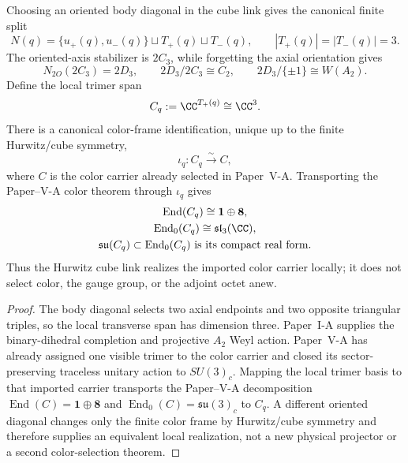 \documentclass[12pt,a4paper]{article}
\begin{document}
\begin{theorem}
\label{p10:thm:hurwitz-trimer-color-carrier}
Choosing an oriented body diagonal in the cube link gives the canonical finite split
\begin{equation}
\label{p10:eq:hurwitz-link-trimer-split}
N(q)=\{u_+(q),u_-(q)\}\sqcup T_+(q)\sqcup T_-(q),
\qquad |T_+(q)|=|T_-(q)|=3.
\end{equation}
The oriented-axis stabilizer is \(2C_3\), while forgetting the axial orientation gives
\begin{equation}
\label{p10:eq:local-binary-dihedral-color-skeleton}
N_{2O}(2C_3)=2D_3,
\qquad
2D_3/2C_3\cong C_2,
\qquad
2D_3/\{\pm1\}\cong W(A_2).
\end{equation}
Define the local trimer span
\begin{equation}
\label{p10:eq:local-trimer-color-carrier}
C_q:=\CC^{T_+(q)}\cong\CC^3.
\end{equation}
There is a canonical color-frame identification, unique up to the finite
Hurwitz/cube symmetry,
\[
\iota_q:C_q\xrightarrow{\sim}C,
\]
where \(C\) is the color carrier already selected in Paper~V-A.  Transporting the
Paper--V-A color theorem through \(\iota_q\) gives
\begin{equation}
\label{p10:eq:local-trimer-adjoint}
\begin{gathered}
\operatorname{End}(C_q)\cong\mathbf1\oplus\mathbf8,\\
\operatorname{End}_0(C_q)\cong\mathfrak{sl}_3(\CC),\\
\mathfrak{su}(C_q)\subset\operatorname{End}_0(C_q)
\ \text{is its compact real form}.
\end{gathered}
\end{equation}
Thus the Hurwitz cube link realizes the imported color carrier locally; it does
not select color, the gauge group, or the adjoint octet anew.
\end{theorem}
\begin{proof}
The body diagonal selects two axial endpoints and two opposite triangular
triples, so the local transverse span has dimension three.  Paper~I-A supplies the
binary-dihedral completion and projective \(A_2\) Weyl action.  Paper~V-A has
already assigned one visible trimer to the color carrier and closed its
sector-preserving traceless unitary action to \(SU(3)_c\).  Mapping the local
trimer basis to that imported carrier transports the Paper--V-A decomposition
\(\operatorname{End}(C)=\mathbf1\oplus\mathbf8\) and
\(\operatorname{End}_0(C)=\mathfrak{su}(3)_c\) to \(C_q\).  A different oriented
diagonal changes only the finite color frame by Hurwitz/cube symmetry and
therefore supplies an equivalent local realization, not a new physical
projector or a second color-selection theorem.
\end{proof}
\end{document}
